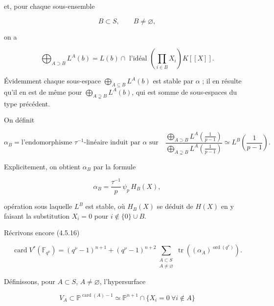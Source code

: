 
et, pour chaque sous-ensemble

\[
B\subset S,\qquad B\ne\varnothing,
\]

on a

\begin{equation}\tag{4.5.20}
\bigoplus_{A\supset B}L^A(b)
=L(b)\cap\text{ l'idéal }
\left(\prod_{i\in B}X_i\right)K[[X]].
\end{equation}

Évidemment chaque sous-espace $\bigoplus_{A\subseteq B}L^A(b)$ est stable
par $\alpha$ ; il en résulte qu'il en est de même pour
$\bigoplus_{A\supsetneq B}L^A(b)$, qui est somme de sous-espaces du type
précédent.

On définit

\begin{equation}\tag{4.5.21}
\alpha_B=\text{l'endomorphisme $\tau^{-1}$-linéaire induit par $\alpha$ sur}
\quad
\frac{\displaystyle\bigoplus_{A\supset B}
L^A\!\left(\frac1{p-1}\right)}
{\displaystyle\bigoplus_{A\supsetneq B}
L^A\!\left(\frac1{p-1}\right)}
\simeq L^B\!\left(\frac1{p-1}\right).
\end{equation}

Explicitement, on obtient $\alpha_B$ par la formule

\begin{equation}\tag{4.5.22}
\alpha_B=\frac{\tau^{-1}}p\,\psi_p\,H_B(X),
\end{equation}

opération sous laquelle $L^B$ est stable, où $H_B(X)$ se déduit de $H(X)$
en y faisant la substitution $X_i=0$ pour $i\notin\{0\}\cup B$.

Récrivons encore (4.5.16)

\begin{equation}\tag{4.5.2.3}
\operatorname{card}V^*(\mathbb F_{q^\nu})
=(q^\nu-1)^{n+1}
+(q^\nu-1)^{n+2}
\sum_{\substack{A\subset S\\A\ne\varnothing}}
\operatorname{tr}\!\left((\alpha_A)^{\operatorname{ord}(q^\nu)}\right).
\end{equation}

Définissons, pour $A\subset S$, $A\ne\varnothing$, l'hypersurface

\begin{equation}\tag{4.5.24}
V_A\subset\mathbb P^{\operatorname{card}(A)-1}
\simeq
\mathbb P^{n+1}\cap
\{X_i=0\ \forall i\notin A\}
\end{equation}

